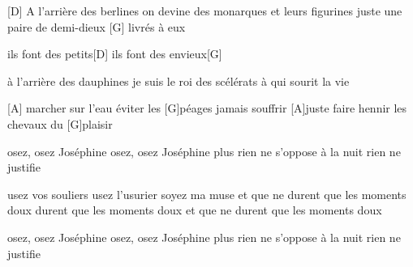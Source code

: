 
[D] 
A l'arrière des berlines
on devine
des monarques et leurs figurines
juste une paire de demi-dieux
[G]
livrés à eux

ils font des petits[D]
ils font des envieux[G]

à l'arrière des dauphines
je suis le roi des scélérats
à qui sourit la vie

[A]
marcher sur l'eau
éviter les [G]péages
jamais souffrir
[A]juste faire hennir
les chevaux du [G]plaisir

osez, osez Joséphine
osez, osez Joséphine
plus rien ne s'oppose à la nuit
rien ne justifie


usez vos souliers
usez l'usurier
soyez ma muse
et que ne durent que les moments doux
durent que les moments doux
et que ne durent que les moments doux

osez, osez Joséphine
osez, osez Joséphine
plus rien ne s'oppose à la nuit
rien ne justifie 